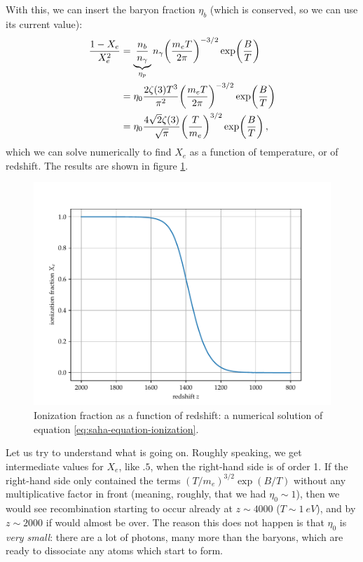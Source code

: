 \documentclass[main.tex]{subfiles}
\begin{document}
With this, we can insert the baryon fraction \(\eta_b\) (which is conserved, so we can use its current value):
%
\begin{subequations}
\begin{align}
  \frac{1- X_e}{X_e^2} &= \underbrace{\frac{n_b}{n_\gamma }}_{\eta_p} 
  n_\gamma
  \qty(\frac{m_e T}{2 \pi })^{-3/2} \exp(\frac{B}{T})   \\
  &= \eta_0 \frac{2 \zeta (3)T^3}{\pi^2} \qty(\frac{m_e T}{2 \pi })^{-3/2} \exp(\frac{B}{T})   \\
  &= \eta_0  \frac{4 \sqrt{2} \zeta (3)}{\sqrt{\pi }} \qty(\frac{T}{m_e})^{3/2} \exp(\frac{B}{T}) \label{eq:saha-equation-ionization}
\,,
\end{align}
\end{subequations}
%
which we can solve numerically to find \(X_e\) as a function of temperature, or of redshift. The results are shown in figure \ref{fig:ionization}. 

\begin{figure}[ht]
\centering
\includegraphics[width=\textwidth]{figures/ionization}
\caption{Ionization fraction as a function of redshift: a numerical solution of equation \eqref{eq:saha-equation-ionization}.}
\label{fig:ionization}
\end{figure}

Let us try to understand what is going on. Roughly speaking, we get intermediate values for \(X_e\), like \(\num{.5}\), when the right-hand side is of order 1.
If the right-hand side only contained the terms \((T/m_e)^{3/2}\exp(B/T)\) without any multiplicative factor in front (meaning, roughly, that we had \(\eta_0 \sim 1\)), then we would see recombination starting to occur already at \(z \sim 4000\) (\(T \sim \SI{1}{eV}\)), and by \(z \sim 2000\) if would almost be over.
The reason this does not happen is that \(\eta_0 \) is \emph{very small}: there are a lot of photons, many more than the baryons, which are ready to dissociate any atoms which start to form.
\end{document}
